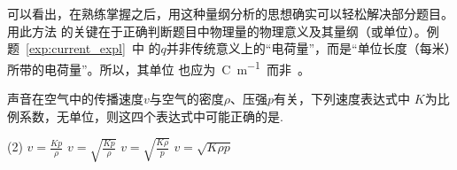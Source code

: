 可以看出，在熟练掌握之后，用这种量纲分析的思想确实可以轻松解决部分题目。用此方法
的关键在于正确判断题目中物理量的物理意义及其量纲（或单位）。例题~\ref{exp:current_expl}~中
的$q$并非传统意义上的“电荷量”，而是“单位长度（每米）所带的电荷量”。所以，其单位
也应为~\unit{\coulomb\per\m}~而非~\unit{\C}。


\begin{exercises}
\item 声音在空气中的传播速度$v$与空气的密度$\rho $、压强$p$有关，下列速度表达式中
    $K$为比例系数，无单位，则这四个表达式中可能正确的是\choiceblank.
    \begin{tasks}(2)
        \task $v=\frac{Kp}{\rho }$
        \task $v=\sqrt{\frac{Kp}{\rho }} $
        \task $v=\sqrt{\frac{K \rho }{p}} $
        \task $v=\sqrt{K \rho p} $
    \end{tasks}
\end{exercises}
